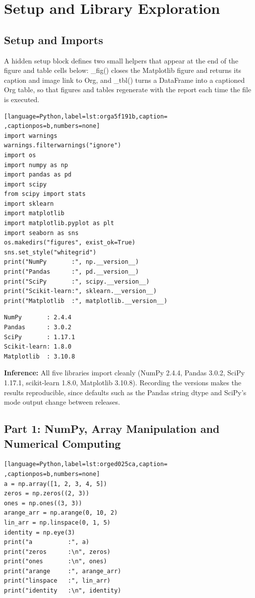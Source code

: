 \documentclass[11pt]{article}
\begin{document}
\section*{Setup and Library Exploration}
\label{sec:org19ecca2}


\subsection*{Setup and Imports}
\label{sec:org3448bf3}


A hidden setup block defines two small helpers that appear at the end of the figure and
table cells below: \_fig() closes the Matplotlib figure and returns its caption and image
link to Org, and \_tbl() turns a DataFrame into a captioned Org table, so that figures and
tables regenerate with the report each time the file is executed.
\begin{lstlisting}[language=Python,label=lst:orga5f191b,caption= ,captionpos=b,numbers=none]
import warnings
warnings.filterwarnings("ignore")
import os
import numpy as np
import pandas as pd
import scipy
from scipy import stats
import sklearn
import matplotlib
import matplotlib.pyplot as plt
import seaborn as sns
os.makedirs("figures", exist_ok=True)
sns.set_style("whitegrid")
print("NumPy       :", np.__version__)
print("Pandas      :", pd.__version__)
print("SciPy       :", scipy.__version__)
print("Scikit-learn:", sklearn.__version__)
print("Matplotlib  :", matplotlib.__version__)
\end{lstlisting}

\begin{verbatim}
NumPy       : 2.4.4
Pandas      : 3.0.2
SciPy       : 1.17.1
Scikit-learn: 1.8.0
Matplotlib  : 3.10.8
\end{verbatim}


\textbf{Inference:} All five libraries import cleanly (NumPy 2.4.4, Pandas 3.0.2, SciPy 1.17.1, scikit-learn
1.8.0, Matplotlib 3.10.8). Recording the versions makes the results reproducible, since
defaults such as the Pandas string dtype and SciPy's mode output change between releases.

\subsection*{Part 1: NumPy, Array Manipulation and Numerical Computing}
\label{sec:orge0db7c0}

\begin{lstlisting}[language=Python,label=lst:orged025ca,caption= ,captionpos=b,numbers=none]
a = np.array([1, 2, 3, 4, 5])
zeros = np.zeros((2, 3))
ones = np.ones((3, 3))
arange_arr = np.arange(0, 10, 2)
lin_arr = np.linspace(0, 1, 5)
identity = np.eye(3)
print("a          :", a)
print("zeros      :\n", zeros)
print("ones       :\n", ones)
print("arange     :", arange_arr)
print("linspace   :", lin_arr)
print("identity   :\n", identity)
\end{lstlisting}
\end{document}
